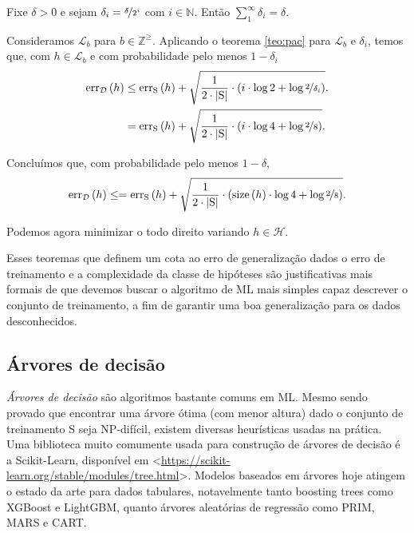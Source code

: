 Fixe $\delta>0$ e sejam $\delta_i=\nicefrac{\delta}{2^i}$ com $i\in\mathds{N}$. Então $\sum_1^\infty \delta_i=\delta$.

Consideramos $\mathcal{L}_b$ para $b\in\mathds{Z}^{\geq}$. Aplicando o teorema \autoref{teo:pac} para $\mathcal{L}_b$ e $\delta_i$, temos que, com $h\in\mathcal{L}_b$ e com probabilidade pelo menos $1-\delta_i$
\begin{align*}
  \mathrm{err}_\mathcal{D}\left(h\vphantom{1j}\right) &\leq \mathrm{err}_\mathrm{S}\left(h\vphantom{1j}\right) + \sqrt{\frac{1}{2\cdot\left|\mathrm{S}\vphantom{1j}\right|}\cdot\left(i\cdot\log2 + \log\nicefrac{2}{\delta_i}\vphantom{1j}\right)}. \\
                                  &= \mathrm{err}_\mathrm{S}\left(h\vphantom{1j}\right) + \sqrt{\frac{1}{2\cdot\left|\mathrm{S}\vphantom{1j}\right|}\cdot\left(i\cdot\log4 + \log\nicefrac{2}{8}\vphantom{1j}\right)}.
\end{align*}

Concluímos que, com probabilidade pelo menos $1-\delta$,
\[
  \mathrm{err}_\mathcal{D}\left(h\vphantom{1j}\right) \leq = \mathrm{err}_\mathrm{S}\left(h\vphantom{1j}\right) + \sqrt{\frac{1}{2\cdot\left|\mathrm{S}\vphantom{1j}\right|}\cdot\left(\mathrm{size}\left(h\vphantom{1j}\right)\cdot\log4 + \log\nicefrac{2}{8}\vphantom{1j}\right)}.
\]

Podemos agora minimizar o todo direito variando $h\in\mathcal{H}$.

Esses teoremas que definem um cota ao erro de generalização dados o erro de treinamento e a complexidade da classe de hipóteses são justificativas mais formais de que devemos buscar o algoritmo de ML mais simples capaz descrever o conjunto de treinamento, a fim de garantir uma boa generalização para os dados desconhecidos.

\subsection{Árvores de decisão}

\textit{Árvores de decisão} são algoritmos bastante comuns em ML. Mesmo sendo provado que encontrar uma árvore ótima (com menor altura) dado o conjunto de treinamento $\mathrm{S}$ seja NP-difícil, existem diversas heurísticas usadas na prática. Uma biblioteca muito comumente usada para construção de árvores de decisão é a Scikit-Learn, disponível em <\href{https://scikit-learn.org/stable/modules/tree.html}{https://scikit-learn.org/stable/modules/tree.html}>. Modelos baseados em árvores hoje atingem o estado da arte para dados tabulares, notavelmente tanto boosting trees como XGBoost e LightGBM, quanto árvores aleatórias de regressão como PRIM, MARS e CART.

